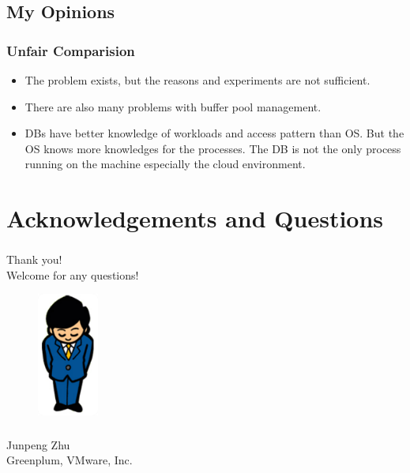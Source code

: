 \documentclass[10pt,svgnames,fragile]{beamer}
\begin{document}
\subsection{My Opinions}
\begin{frame}
	\frametitle{Unfair Comparision}
	\begin{itemize}
		\item<1-> The problem exists, but the reasons and experiments are not sufficient.
		\item<2-> There are also many problems with buffer pool management.
		\item<3-> DBs have better knowledge of workloads and access pattern than OS. But the OS knows more knowledges for the processes. {\color{red}The DB is not the only process running on the machine especially the cloud environment}.
	\end{itemize}
\end{frame}

\section{Acknowledgements and Questions}
\begin{frame}
	\frametitle{}
	\begin{center}
		Thank you! \\
		Welcome for any questions!
	\end{center}
	\begin{figure}
		\includegraphics[width=2cm]{images/thanks.png}
	\end{figure}
	\frametitle{}
	\begin{center}
		Junpeng Zhu \\
		Greenplum, VMware, Inc.
	\end{center}
\end{frame}
\end{document}
